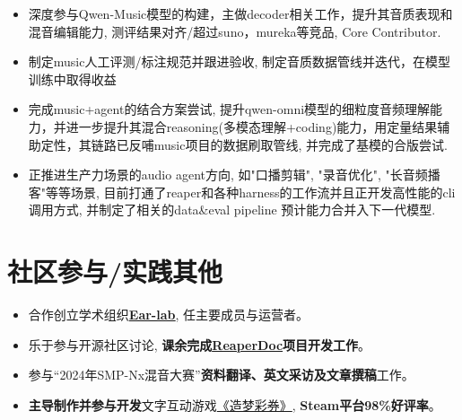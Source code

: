 \documentclass{resume}
\begin{document}
\begin{itemize}
  \item 深度参与Qwen-Music模型的构建，主做decoder相关工作，提升其音质表现和混音编辑能力, 测评结果对齐/超过suno，mureka等竞品, Core Contributor.
  \item 制定music人工评测/标注规范并跟进验收, 制定音质数据管线并迭代，在模型训练中取得收益
  \item 完成music+agent的结合方案尝试, 提升qwen-omni模型的细粒度音频理解能力，并进一步提升其混合reasoning(多模态理解+coding)能力，用定量结果辅助定性，其链路已反哺music项目的数据刷取管线, 并完成了基模的合版尝试.
  \item 正推进生产力场景的audio agent方向, 如"口播剪辑", "录音优化", "长音频播客"等等场景, 目前打通了reaper和各种harness的工作流并且正开发高性能的cli调用方式, 并制定了相关的data\&eval pipeline 预计能力合并入下一代模型.
\end{itemize}

\section{社区参与/实践其他}
\begin{itemize}[parsep=0.2ex]
  \item 合作创立学术组织\textbf{\href{https://github.com/Eps-Acoustic-Revolution-Lab}{\uline{Ear-lab}}}, 任主要成员与运营者。
  \item 乐于参与开源社区讨论, \textbf{课余完成\href{https://github.com/DDDPG/ReaperDoc}{\uline{ReaperDoc}}项目开发工作}。
  \item 参与“2024年SMP-Nx混音大赛”\textbf{资料翻译、英文采访及文章撰稿}工作。
  \item \textbf{主导制作并参与开发}文字互动游戏\href{https://store.steampowered.com/app/2414730/Elf_of_Era_Idols_Project/}{《造梦彩券》}, \textbf{Steam平台98\%好评率}。
\end{itemize}

%
%
\end{document}
